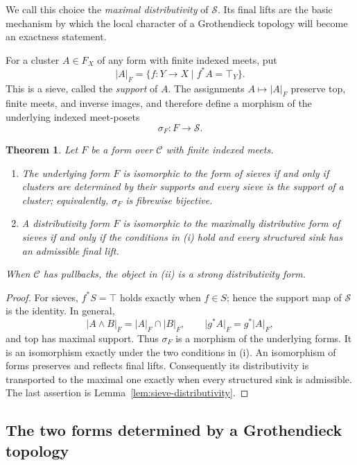 \documentclass[12pt,oneside,reqno]{amsart}
\newtheorem{theorem}{Theorem}[section]
\theoremstyle{definition}
\theoremstyle{remark}
\newcommand{\C}{\mathcal C}
\newcommand{\Sieve}{\mathscr S}
\newcommand{\supp}[2][]{\lvert #2\rvert_{#1}}
\begin{document}
We call this choice the \emph{maximal distributivity} of \(\Sieve\).
Its final lifts are the basic mechanism by which the local character of
a Grothendieck topology will become an exactness statement.

For a cluster \(A\in F_X\) of any form with finite indexed meets, put
\begin{equation}\label{eq:support-sieve-early}
 \supp[F]{A}=\{f:Y\to X\mid f^*A=\top_Y\}.
\end{equation}
This is a sieve, called the \emph{support} of \(A\).  The assignments
\(A\mapsto\supp[F]{A}\) preserve top, finite meets, and inverse images,
and therefore define a morphism of the underlying indexed meet-posets
\[
                     \sigma_F:F\longrightarrow\Sieve.
\]

\begin{theorem}\label{thm:characterize-sieve-form}
Let \(F\) be a form over \(\C\) with finite indexed meets.
\begin{enumerate}[label=\textup{(\roman*)}]
\item The underlying form \(F\) is isomorphic to the form of sieves if
and only if clusters are determined by their supports and every sieve
is the support of a cluster; equivalently, \(\sigma_F\) is fibrewise
bijective.
\item A distributivity form \(F\) is isomorphic to the maximally
distributive form of sieves if and only if the conditions in \textup{(i)}
hold and every structured sink has an admissible final lift.
\end{enumerate}
When \(\C\) has pullbacks, the object in \textup{(ii)} is a strong
distributivity form.
\end{theorem}

\begin{proof}
For sieves, \(f^*S=\top\) holds exactly when \(f\in S\); hence the
support map of \(\Sieve\) is the identity.  In general,
\[
 \supp[F]{A\wedge B}=\supp[F]{A}\cap\supp[F]{B},\qquad
 \supp[F]{g^*A}=g^*\supp[F]{A},
\]
and top has maximal support.  Thus \(\sigma_F\) is a morphism of the
underlying forms.  It is an isomorphism exactly under the two conditions
in \textup{(i)}.  An isomorphism of forms preserves and reflects final
lifts.  Consequently its distributivity is transported to the maximal
one exactly when every structured sink is admissible.  The last
assertion is Lemma~\ref{lem:sieve-distributivity}.
\end{proof}

\subsection{The two forms determined by a Grothendieck topology}
\end{document}

